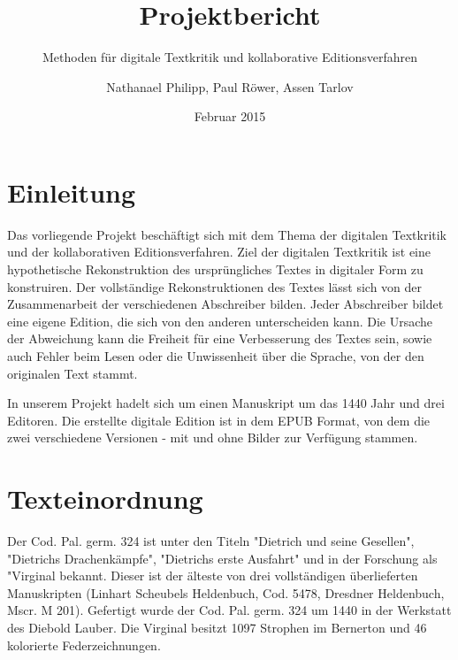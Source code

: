 \documentclass[a4paper, 12pt, oneside]{scrbook}
\author{Nathanael Philipp, Paul Röwer, Assen Tarlov}
\title{Projektbericht}
\subtitle{Methoden für digitale Textkritik und kollaborative Editionsverfahren}
\date{Februar 2015}
\begin{document}
\maketitle\newpage
\tableofcontents\newpage
\chapter{Einleitung}

Das vorliegende Projekt beschäftigt sich mit dem Thema der digitalen Textkritik und der kollaborativen Editionsverfahren. 
Ziel der digitalen Textkritik ist eine hypothetische Rekonstruktion des ursprüngliches Textes in digitaler Form zu konstruiren. Der vollständige Rekonstruktionen des Textes lässt sich von der Zusammenarbeit der verschiedenen Abschreiber bilden. Jeder Abschreiber bildet eine eigene Edition, die sich von den anderen unterscheiden kann. Die Ursache der Abweichung kann die Freiheit für eine Verbesserung des Textes sein, sowie auch Fehler beim Lesen oder die Unwissenheit über die Sprache, von der den originalen Text stammt.  

In unserem Projekt hadelt sich um einen Manuskript um das 1440 Jahr und drei Editoren. Die erstellte digitale Edition ist in dem EPUB Format, von dem die zwei verschiedene Versionen - mit und ohne Bilder zur Verfügung stammen. 


\chapter{Texteinordnung}
Der Cod. Pal. germ. 324 ist unter den Titeln "Dietrich und seine Gesellen", "Dietrichs Drachenkämpfe", "Dietrichs erste Ausfahrt" und in der Forschung als "Virginal bekannt. Dieser ist der älteste von drei vollständigen überlieferten Manuskripten (Linhart Scheubels Heldenbuch, Cod. 5478, Dresdner Heldenbuch, Mscr. M 201). Gefertigt wurde der Cod. Pal. germ. 324 um 1440 in der Werkstatt des Diebold Lauber. Die Virginal besitzt 1097 Strophen im Bernerton und 46 kolorierte Federzeichnungen.\cite{ubheidelber_bibpal}
\end{document}
